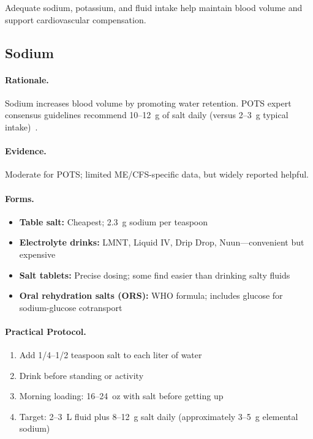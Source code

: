 Adequate sodium, potassium, and fluid intake help maintain blood volume and support cardiovascular compensation.

\subsection{Sodium}

\paragraph{Rationale.} Sodium increases blood volume by promoting water retention. POTS expert consensus guidelines recommend 10--12~g of salt daily (versus 2--3~g typical intake)~\cite{Sheldon2015POTScriteria}.

\paragraph{Evidence.} Moderate for POTS; limited ME/CFS-specific data, but widely reported helpful.

\paragraph{Forms.}
\begin{itemize}
    \item \textbf{Table salt:} Cheapest; 2.3~g sodium per teaspoon
    \item \textbf{Electrolyte drinks:} LMNT, Liquid IV, Drip Drop, Nuun---convenient but expensive
    \item \textbf{Salt tablets:} Precise dosing; some find easier than drinking salty fluids
    \item \textbf{Oral rehydration salts (ORS):} WHO formula; includes glucose for sodium-glucose cotransport
\end{itemize}

\paragraph{Practical Protocol.}
\begin{enumerate}
    \item Add 1/4--1/2 teaspoon salt to each liter of water
    \item Drink before standing or activity
    \item Morning loading: 16--24~oz with salt before getting up
    \item Target: 2--3~L fluid plus 8--12~g salt daily (approximately 3--5~g elemental sodium)
\end{enumerate}

